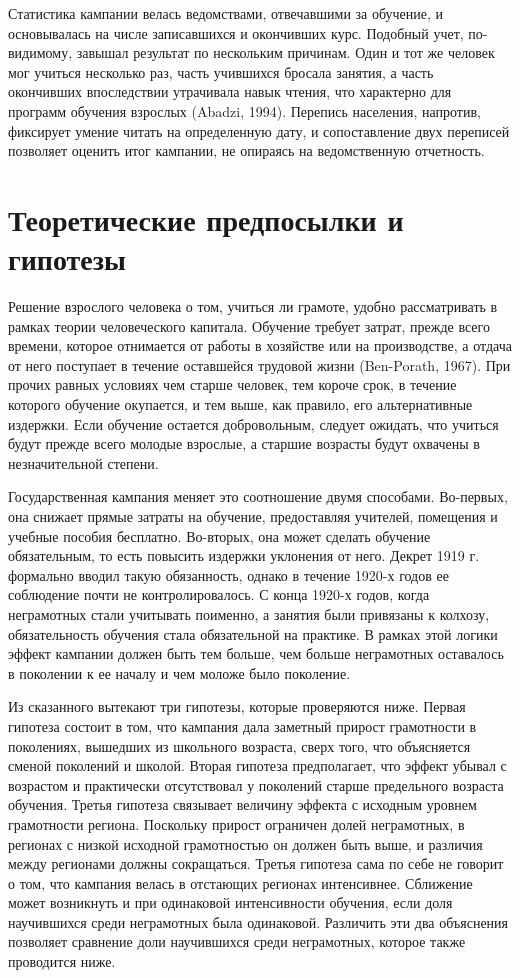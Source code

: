\documentclass[12pt]{article}
\begin{document}
Статистика кампании велась ведомствами, отвечавшими за обучение, и основывалась на числе записавшихся и окончивших курс. Подобный учет, по-видимому, завышал результат по нескольким причинам. Один и тот же человек мог учиться несколько раз, часть учившихся бросала занятия, а часть окончивших впоследствии утрачивала навык чтения, что характерно для программ обучения взрослых (Abadzi, 1994). Перепись населения, напротив, фиксирует умение читать на определенную дату, и сопоставление двух переписей позволяет оценить итог кампании, не опираясь на ведомственную отчетность.

\section{Теоретические предпосылки и гипотезы}

Решение взрослого человека о том, учиться ли грамоте, удобно рассматривать в рамках теории человеческого капитала. Обучение требует затрат, прежде всего времени, которое отнимается от работы в хозяйстве или на производстве, а отдача от него поступает в течение оставшейся трудовой жизни (Ben-Porath, 1967). При прочих равных условиях чем старше человек, тем короче срок, в течение которого обучение окупается, и тем выше, как правило, его альтернативные издержки. Если обучение остается добровольным, следует ожидать, что учиться будут прежде всего молодые взрослые, а старшие возрасты будут охвачены в незначительной степени.

Государственная кампания меняет это соотношение двумя способами. Во-первых, она снижает прямые затраты на обучение, предоставляя учителей, помещения и учебные пособия бесплатно. Во-вторых, она может сделать обучение обязательным, то есть повысить издержки уклонения от него. Декрет 1919 г. формально вводил такую обязанность, однако в течение 1920-х годов ее соблюдение почти не контролировалось. С конца 1920-х годов, когда неграмотных стали учитывать поименно, а занятия были привязаны к колхозу, обязательность обучения стала обязательной на практике. В рамках этой логики эффект кампании должен быть тем больше, чем больше неграмотных оставалось в поколении к ее началу и чем моложе было поколение.

Из сказанного вытекают три гипотезы, которые проверяются ниже. Первая гипотеза состоит в том, что кампания дала заметный прирост грамотности в поколениях, вышедших из школьного возраста, сверх того, что объясняется сменой поколений и школой. Вторая гипотеза предполагает, что эффект убывал с возрастом и практически отсутствовал у поколений старше предельного возраста обучения. Третья гипотеза связывает величину эффекта с исходным уровнем грамотности региона. Поскольку прирост ограничен долей неграмотных, в регионах с низкой исходной грамотностью он должен быть выше, и различия между регионами должны сокращаться. Третья гипотеза сама по себе не говорит о том, что кампания велась в отстающих регионах интенсивнее. Сближение может возникнуть и при одинаковой интенсивности обучения, если доля научившихся среди неграмотных была одинаковой. Различить эти два объяснения позволяет сравнение доли научившихся среди неграмотных, которое также проводится ниже.
\end{document}

